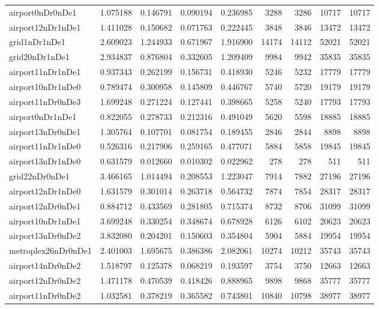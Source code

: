 \begin{longtable}{|l|r|r|r|r|r|r|r|r|}
airport0nDr0nDe1 & 1.075188 & 0.146791 & 0.090194 & 0.236985 & 3288 & 3286 & 10717 & 10717 \\
airport12nDr1nDe1 & 1.411028 & 0.150682 & 0.071763 & 0.222445 & 3848 & 3846 & 13472 & 13472 \\
grid1nDr1nDe1 & 2.609023 & 1.244933 & 0.671967 & 1.916900 & 14174 & 14112 & 52021 & 52021 \\
grid20nDr1nDe1 & 2.934837 & 0.876804 & 0.332605 & 1.209409 & 9984 & 9942 & 35835 & 35835 \\
airport11nDr1nDe1 & 0.937343 & 0.262199 & 0.156731 & 0.418930 & 5246 & 5232 & 17779 & 17779 \\
airport10nDr1nDe0 & 0.789474 & 0.300958 & 0.145809 & 0.446767 & 5740 & 5720 & 19179 & 19179 \\
airport11nDr0nDe3 & 1.699248 & 0.271224 & 0.127441 & 0.398665 & 5258 & 5240 & 17793 & 17793 \\
airport0nDr1nDe1 & 0.822055 & 0.278733 & 0.212316 & 0.491049 & 5620 & 5598 & 18885 & 18885 \\
airport13nDr0nDe1 & 1.305764 & 0.107701 & 0.081754 & 0.189455 & 2846 & 2844 & 8898 & 8898 \\
airport11nDr1nDe0 & 0.526316 & 0.217906 & 0.259165 & 0.477071 & 5884 & 5858 & 19845 & 19845 \\
airport13nDr1nDe0 & 0.631579 & 0.012660 & 0.010302 & 0.022962 & 278 & 278 & 511 & 511 \\
grid22nDr0nDe1 & 3.466165 & 1.014494 & 0.208553 & 1.223047 & 7914 & 7882 & 27196 & 27196 \\
airport12nDr1nDe0 & 1.631579 & 0.301014 & 0.263718 & 0.564732 & 7874 & 7854 & 28317 & 28317 \\
airport12nDr0nDe1 & 0.884712 & 0.433569 & 0.281805 & 0.715374 & 8732 & 8706 & 31099 & 31099 \\
airport10nDr1nDe1 & 3.699248 & 0.330254 & 0.348674 & 0.678928 & 6126 & 6102 & 20623 & 20623 \\
airport13nDr0nDe2 & 3.832080 & 0.204201 & 0.150603 & 0.354804 & 5904 & 5884 & 19954 & 19954 \\
metroplex26nDr0nDe1 & 2.401003 & 1.695675 & 0.386386 & 2.082061 & 10274 & 10212 & 35743 & 35743 \\
airport14nDr0nDe2 & 1.518797 & 0.125378 & 0.068219 & 0.193597 & 3754 & 3750 & 12663 & 12663 \\
airport12nDr0nDe2 & 1.471178 & 0.470539 & 0.418426 & 0.888965 & 9898 & 9868 & 35777 & 35777 \\
airport11nDr0nDe2 & 1.032581 & 0.378219 & 0.365582 & 0.743801 & 10840 & 10798 & 38977 & 38977 \\

\end{longtable}
